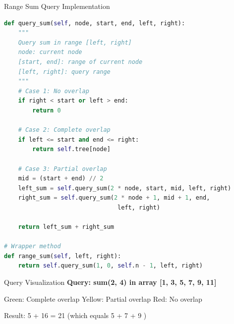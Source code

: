 \documentclass[aspectratio=169]{beamer}
\begin{document}
\begin{frame}[fragile]{Range Sum Query Implementation}
  \begin{lstlisting}[language=Python, basicstyle=\ttfamily\footnotesize]
def query_sum(self, node, start, end, left, right):
    """
    Query sum in range [left, right]
    node: current node
    [start, end]: range of current node
    [left, right]: query range
    """
    # Case 1: No overlap
    if right < start or left > end:
        return 0

    # Case 2: Complete overlap
    if left <= start and end <= right:
        return self.tree[node]

    # Case 3: Partial overlap
    mid = (start + end) // 2
    left_sum = self.query_sum(2 * node, start, mid, left, right)
    right_sum = self.query_sum(2 * node + 1, mid + 1, end,
                                left, right)

    return left_sum + right_sum

# Wrapper method
def range_sum(self, left, right):
    return self.query_sum(1, 0, self.n - 1, left, right)
  \end{lstlisting}
\end{frame}

\begin{frame}{Query Visualization}
  \textbf{Query: sum(2, 4) in array [1, 3, 5, 7, 9, 11]}

  \begin{center}
  \end{center}

  \vspace{0.3cm}
  \small
  \textcolor{green!70!black}{Green: Complete overlap} \quad
  \textcolor{yellow!70!black}{Yellow: Partial overlap} \quad
  \textcolor{red!70!black}{Red: No overlap}

  \vspace{0.3cm}
  Result: 5 + 16 = 21 (which equals 5 + 7 + 9 \checkmark)
\end{frame}
\end{document}
